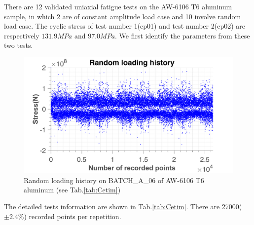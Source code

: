 There are 12 validated uniaxial fatigue tests on the AW-6106 T6 aluminum sample, in which 2 are of constant amplitude load case and 10 involve random  load case. 
The cyclic stress of test number 1(ep01) and test number 2(ep02) are respectively $131.9MPa$ and $97.0MPa$. We first identify the parameters from these two tests. 

\begin{figure}[!h]
\centering
\includegraphics[width=\textwidth]{figures//EP_a_06_random.png} 
\caption{Random loading history on BATCH\_A\_06 of AW-6106 T6 aluminum (see Tab.\ref{tab:Cetim})}
\end{figure}	
The detailed tests information are shown in Tab.\ref{tab:Cetim}. There are 27000($\pm 2.4\%$) recorded points per repetition. 

